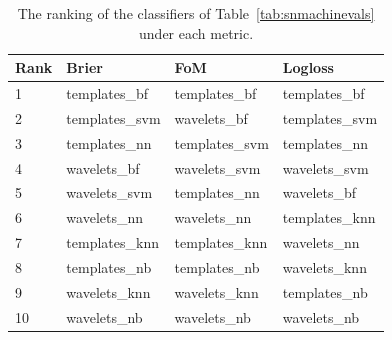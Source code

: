 \begin{table}[]
\begin{tabular}{llll}
Rank & Brier           & FoM             & Logloss       \\
\hline
1 & templates\_bf	 	& templates\_bf 	& templates\_bf \\
2 & templates\_svm 	& wavelets\_bf		& templates\_svm \\
3 & templates\_nn 	& templates\_svm	& templates\_nn \\
4 & wavelets\_bf 		& wavelets\_svm		& wavelets\_svm \\
5 & wavelets\_svm 	& templates\_nn		& wavelets\_bf \\
6 & wavelets\_nn 		& wavelets\_nn		& templates\_knn \\
7 & templates\_knn 	& templates\_knn	& wavelets\_nn \\
8 & templates\_nb 	& templates\_nb		& wavelets\_knn \\
9 & wavelets\_knn 	& wavelets\_knn		& templates\_nb \\
10 & wavelets\_nb 		& wavelets\_nb		& wavelets\_nb \\
\end{tabular}
\caption{The ranking of the classifiers of Table~\ref{tab:snmachinevals} under each metric.}
\label{tab:snmachinerank}
\end{table}

